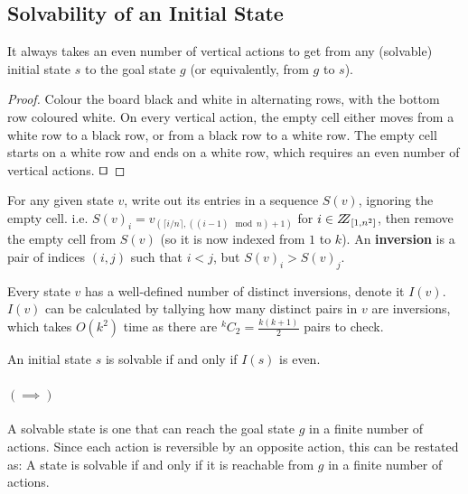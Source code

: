 \documentclass[runningheads]{llncs}
\begin{document}
\subsection{Solvability of an Initial State \cite{Solvability}}
\label{subsec:solvability}
\begin{lemma}\label{lem:evennumofvertactions}
It always takes an even number of vertical actions to get from any (solvable) initial state $s$ to the goal state $g$ (or equivalently, from $g$ to $s$).
\end{lemma}
\begin{proof}
Colour the board black and white in alternating rows, with the bottom row coloured white. On every vertical action, the empty cell either moves from a white row to a black row, or from a black row to a white row. The empty cell starts on a white row and ends on a white row, which requires an even number of vertical actions. $\qed$
\end{proof}

\begin{definition}\label{def:inversion}
For any given state $v$, write out its entries in a sequence $S(v)$, ignoring the empty cell. i.e. $S(v)_i = v_{(\lceil i/n\rceil, ((i-1) \mod n) +1)}$ for $i \in \bbbz_{[1,n^2]}$, then remove the empty cell from $S(v)$ (so it is now indexed from $1$ to $k$). An \textbf{inversion} is a pair of indices $(i,j)$ such that $i < j$, but $S(v)_i > S(v)_j$.
\end{definition}
Every state $v$ has a well-defined number of distinct inversions, denote it $I(v)$. $I(v)$ can be calculated by tallying how many distinct pairs in $v$ are inversions, which takes $O(k^2)$ time as there are $^kC_2 = \frac{k(k+1)}{2}$ pairs to check.

\begin{theorem}\label{thm:solvability}
An initial state $s$ is solvable if and only if $I(s)$ is even.
\end{theorem}
\paragraph{$(\implies)$}
A solvable state is one that can reach the goal state $g$ in a finite number of actions. Since each action is reversible by an opposite action, this can be restated as: A state is solvable if and only if it is reachable from $g$ in a finite number of actions.
\end{document}
